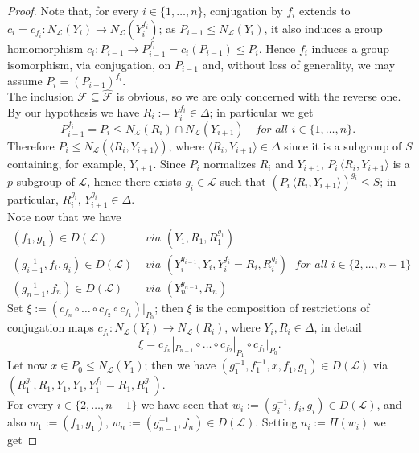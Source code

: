 \documentclass{amsart}
\numberwithin{equation}{section}
\theoremstyle{definition}
\theoremstyle{subresult}
\theoremstyle{caseresult}
\newcommand{\F}{\mathcal{F}}
\renewcommand{\L}{\mathcal{L}}
\newcommand{\inv}{^{-1}}
\newcommand{\wht}{\widehat}
\newcommand{\fto}{\longrightarrow}
\newcommand{\<}{\langle}
\renewcommand{\>}{\rangle}
\begin{document}
\begin{proof}
	Note that, for every $i \in \{1,\dots,n\}$, conjugation by $f_i$ extends to $c_i=c_{f_i} \colon N_\L(Y_i) \fto N_\L(Y_i^{f_i})$; as $P_{i-1} \le N_\L(Y_i)$, it also induces a group homomorphism $c_i \colon P_{i-1} \fto P_{i-1}^{f_i} = c_i(P_{i-1}) \le P_i$. Hence $f_i$ induces a group isomorphism, via conjugation, on $P_{i-1}$ and, without loss of generality, we may assume $P_i = (P_{i-1})^{f_i}$. \\
	
	The inclusion $\F \subseteq \wht{\F}$ is obvious, so we are only concerned with the reverse one.\\
	By our hypothesis we have $R_i:= Y_i^{f_i} \in \Delta$; in particular we get
	\begin{equation*}
		\label{eq:inclusion poperty of the P_i}
		\tag{$\star$}
		P_{i-1}^{f_i} = P_i \le N_\L(R_i) \cap N_\L(Y_{i+1}) \quad \textit{for all $i \in \{1,\dots,n\}$. }
	\end{equation*}
	Therefore $P_i \le N_\L(\< R_i,Y_{i+1} \>)$, where $\<R_i,Y_{i+1} \> \in \Delta$ since it is a subgroup of $S$ containing, for example, $Y_{i+1}$. Since $P_i$ normalizes $R_i$ and $Y_{i+1}$, $P_i \, \<R_i,Y_{i+1} \>$ is a $p$-subgroup of $\L$, hence there exists $g_i \in \L$ such that $(P_i \, \<R_i,Y_{i+1}\>)^{g_i} \le S$; in particular, $R_i^{g_i}, \, Y_{i+1}^{g_i} \in \Delta$.\\
	Note now that we have
	\begin{align*}
		(f_1,g_1) \in D(\L) & \textit{ via } (Y_1, R_1, R_1^{g_1}) \\
		(g_{i-1}\inv,f_i,g_i) \in D(\L) & \textit{ via } (Y_i^{g_{i-1}},Y_i, Y_i^{f_i}=R_i, R_i^{g_i} ) \; \textit{ for all $i \in \{2,\dots,n-1\}$} \\
		(g_{n-1}\inv, f_n) \in D(\L) & \textit{ via } (Y_n^{g_{n-1}}, R_n)
	\end{align*}
	Set $\xi := (c_{f_n} \circ \dots \circ c_{f_2} \circ c_{f_1})|_{P_0}$; then $\xi$ is the composition of restrictions of conjugation maps $c_{f_i}: N_\L(Y_i) \fto N_\L(R_i)$, where $Y_i,R_i \in \Delta$, in detail
	\[
	\xi =  c_{f_n}|_{P_{n-1}} \circ \dots \circ c_{f_2}|_{P_1} \circ c_{f_1}|_{P_0} .
	\]
	Let now $x \in P_0 \le N_\L(Y_1)$; then we have $(g_1\inv, f_1 \inv , x, f_1, g_1) \in D(\L)$ via $(R_1^{g_1}, R_1, Y_1, Y_1, Y_1^{f_1} = R_1, R_1^{g_1})$.\\
	For every $i \in \{2,\dots,n-1\}$ we have seen that $w_i :=(g_i\inv, f_i,g_i) \in D(\L)$, and also $w_1:=(f_1,g_1), \, w_n:=(g_{n-1}\inv,f_n) \in D(\L)$. Setting $u_i:=\Pi(w_i)$ we get

\end{proof}
\end{document}
